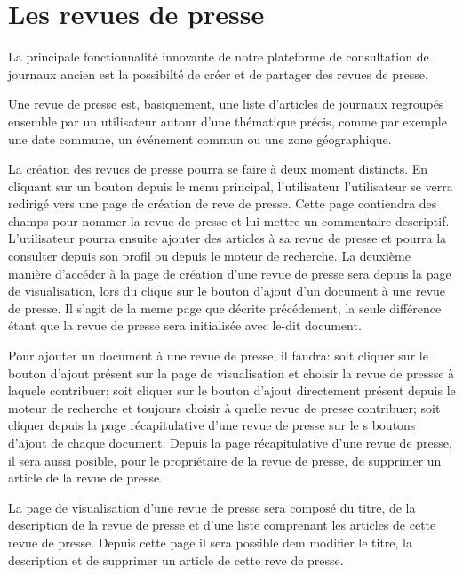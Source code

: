 \section{Les revues de presse}
\label{sec:revue}

La principale fonctionnalité innovante de notre plateforme de consultation de journaux ancien est la possibilté de
créer et de partager des revues de presse.

Une revue de presse est, basiquement, une liste d'articles de journaux regroupés ensemble par un utilisateur autour d'une thématique précis,
comme par exemple une date commune, un événement commun ou une zone géographique.

La création des revues de presse pourra se faire à deux moment distincts. En cliquant sur un bouton depuis le menu principal, l'utilisateur
l'utilisateur se verra redirigé vers une page de création de reve de presse. Cette page contiendra des champs pour nommer la revue de presse
et lui mettre un commentaire descriptif. L'utilisateur pourra ensuite ajouter des articles à sa revue de presse et pourra la consulter depuis
son profil ou depuis le moteur de recherche. La deuxième manière d'accéder à la page de création d'une revue de presse sera depuis la page de
visualisation, lors du clique sur le bouton d'ajout d'un document à une revue de presse. Il s'agit de la meme page que décrite précédement,
la seule différence étant que la revue de presse sera initialisée avec le-dit document.

Pour ajouter un document à une revue de presse, il faudra: soit cliquer sur le bouton d'ajout présent sur la page de visualisation et choisir la
revue de pressse à laquele contribuer; soit cliquer sur le bouton d'ajout directement présent depuis le moteur de recherche et toujours choisir
à quelle revue de presse contribuer; soit cliquer depuis la page récapitulative d'une revue de presse sur le s boutons d'ajout de chaque document.
Depuis la page récapitulative d'une revue de presse, il sera aussi posible, pour le propriétaire de la revue de presse, de supprimer un article de
la revue de presse.

La page de visualisation d'une revue de presse sera composé du titre, de la description de la revue de presse et d'une liste comprenant les articles
de cette revue de presse. Depuis cette page il sera possible dem modifier le titre, la description et de supprimer un article de cette reve de presse.